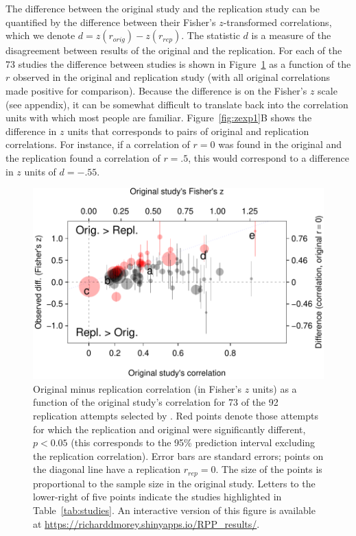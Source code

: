 \documentclass[doc,a4paper,floatsintext,draftfirst]{apa6}
\makeatletter
\def\maxwidth{ %
  \ifdim\Gin@nat@width>\linewidth
    \linewidth
  \else
    \Gin@nat@width
  \fi
}
\makeatother
\begin{document}
\nocite{Patil:etal:2016}

The difference between the original study and the replication study can be quantified by the difference between their Fisher's $z$-transformed correlations, which we denote $d = z(r_{orig}) - z(r_{rep})$. The statistic $d$ is a measure of the disagreement between results of the original and the replication. For each of the 73 studies the difference between studies is shown in Figure~\ref{fig:resid1} as a function of the $r$ observed in the original and replication study (with all original correlations made positive for comparison). Because the difference is on the Fisher's $z$ scale (see appendix), it can be somewhat difficult to translate back into the correlation units with which most people are familiar. Figure~\ref{fig:zexp1}B shows the difference in $z$ units that corresponds to pairs of original and replication correlations. For instance, if a correlation of $r=0$ was found in the original and the replication found a correlation of $r=.5$, this would correspond to a difference in $z$ units of $d=-.55$. 


\begin{figure}[ht]
\includegraphics[width=\maxwidth]{figure/resid1-1} \caption{Original minus replication correlation (in Fisher's $z$ units) as a function of the original study's correlation for 73 of the 92 replication attempts selected by \citet{Patil:etal:2016}. Red points denote those attempts for which the replication and original were significantly different, $p<0.05$ (this corresponds to the 95\% prediction interval excluding the replication correlation). Error bars are standard errors; points on the diagonal line have a replication $r_{rep}=0$. The size of the points is proportional to the sample size in the original study. Letters to the lower-right of five points indicate the studies highlighted in Table~\ref{tab:studies}. An interactive version of this figure is available at \protect\url{https://richarddmorey.shinyapps.io/RPP_results/}.}\label{fig:resid1}
\end{figure}
\end{document}
